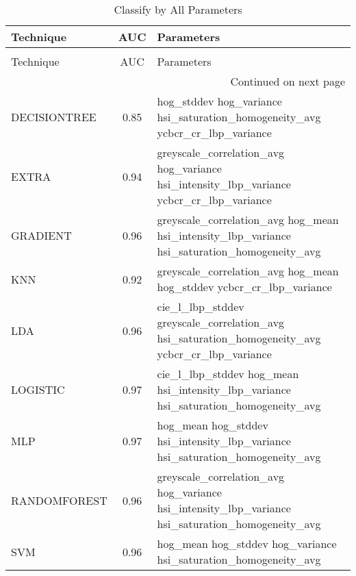 \begin{longtable}{lcl}
\caption[Classify by All Parameters]{Classify by All Parameters}
\label{table:results-all}\\
\toprule
   Technique &  AUC &                                                                                       Parameters \\
\midrule
\endfirsthead
\caption[]{Classify by All Parameters} \\
\toprule
   Technique &  AUC &                                                                                       Parameters \\
\midrule
\endhead
\midrule
\multicolumn{3}{r}{{Continued on next page}} \\
\midrule
\endfoot

\bottomrule
\endlastfoot
DECISIONTREE & 0.85 &                     hog\_stddev hog\_variance hsi\_saturation\_homogeneity\_avg ycbcr\_cr\_lbp\_variance \\
       EXTRA & 0.94 &          greyscale\_correlation\_avg hog\_variance hsi\_intensity\_lbp\_variance ycbcr\_cr\_lbp\_variance \\
    GRADIENT & 0.96 &     greyscale\_correlation\_avg hog\_mean hsi\_intensity\_lbp\_variance hsi\_saturation\_homogeneity\_avg \\
         KNN & 0.92 &                              greyscale\_correlation\_avg hog\_mean hog\_stddev ycbcr\_cr\_lbp\_variance \\
         LDA & 0.96 &  cie\_l\_lbp\_stddev greyscale\_correlation\_avg hsi\_saturation\_homogeneity\_avg ycbcr\_cr\_lbp\_variance \\
    LOGISTIC & 0.97 &              cie\_l\_lbp\_stddev hog\_mean hsi\_intensity\_lbp\_variance hsi\_saturation\_homogeneity\_avg \\
         MLP & 0.97 &                    hog\_mean hog\_stddev hsi\_intensity\_lbp\_variance hsi\_saturation\_homogeneity\_avg \\
RANDOMFOREST & 0.96 & greyscale\_correlation\_avg hog\_variance hsi\_intensity\_lbp\_variance hsi\_saturation\_homogeneity\_avg \\
         SVM & 0.96 &                                  hog\_mean hog\_stddev hog\_variance hsi\_saturation\_homogeneity\_avg \\
\end{longtable}
